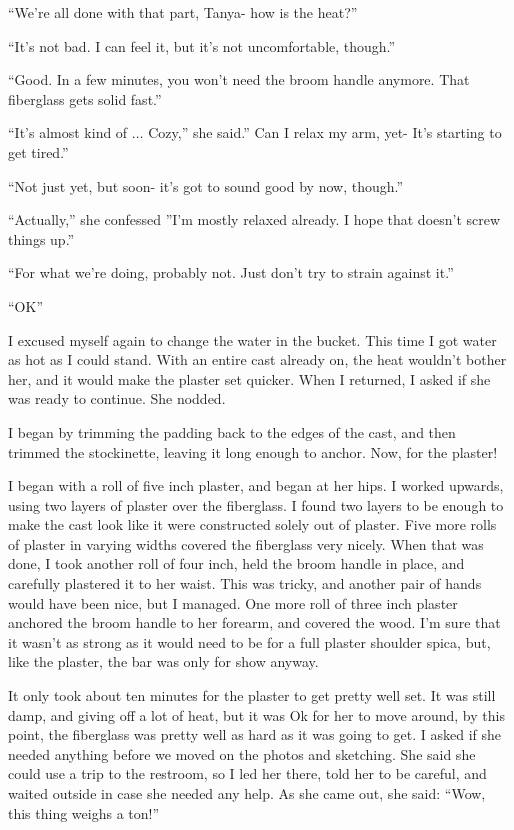 ``We're all done with that part, Tanya- how is the heat?''

``It's not bad. I can feel it, but it's not uncomfortable, though.''

``Good. In a few minutes, you won't need the broom handle anymore. That fiberglass gets solid
fast.''

``It's almost kind of $\ldots$ Cozy,'' she said.'' Can I relax my arm, yet- It's starting to get
tired.''

``Not just yet, but soon- it's got to sound good by now, though.''

``Actually,'' she confessed ''I'm mostly relaxed already. I hope that doesn't screw things
up.''

``For what we're doing, probably not. Just don't try to strain against it.''

``OK''

I excused myself again to change the water in the bucket. This time I got water as hot as I
could stand. With an entire cast already on, the heat wouldn't bother her, and it would make the
plaster set quicker. When I returned, I asked if she was ready to continue. She nodded.

I began by trimming the padding back to the edges of the cast, and then trimmed the
stockinette, leaving it long enough to anchor. Now, for the plaster!

I began with a roll of five inch plaster, and began at her hips. I worked upwards, using two
layers of plaster over the fiberglass. I found two layers to be enough to make the cast look
like it were constructed solely out of plaster. Five more rolls of plaster in varying widths
covered the fiberglass very nicely. When that was done, I took another roll of four inch, held
the broom handle in place, and carefully plastered it to her waist. This was tricky, and another
pair of hands would have been nice, but I managed. One more roll of three inch plaster anchored
the broom handle to her forearm, and covered the wood. I'm sure that it wasn't as strong as it
would need to be for a full plaster shoulder spica, but, like the plaster, the bar was only for
show anyway.

It only took about ten minutes for the plaster to get pretty well set. It was still damp,
and giving off a lot of heat, but it was Ok for her to move around, by this point, the
fiberglass was pretty well as hard as it was going to get. I asked if she needed anything before
we moved on the photos and sketching. She said she could use a trip to the restroom, so I led
her there, told her to be careful, and waited outside in case she needed any help. As she came
out, she said: ``Wow, this thing weighs a ton!''

